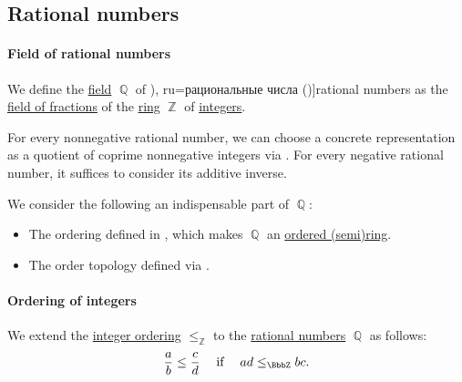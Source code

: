 \subsection{Rational numbers}\label{subsec:rational_numbers}

\paragraph{Field of rational numbers}

\begin{definition}\label{def:rational_numbers}
  We define the \hyperref[def:field]{field} \( \BbbQ \) of \term[bg=рационални числа (\cite[18]{Тагамлицки1971Диф}), ru=рациональные числа (\cite[sec. 15.1]{Тыртышников2007})]{rational numbers} as the \hyperref[thm:field_of_fractions]{field of fractions} of the \hyperref[def:ring]{ring} \( \BbbZ \) of \hyperref[def:integers]{integers}.
\end{definition}
\begin{comments}
  \item For every nonnegative rational number, we can choose a concrete representation as a quotient of coprime nonnegative integers via . For every negative rational number, it suffices to consider its additive inverse.

  \item We consider the following an indispensable part of \( \BbbQ \):
  \begin{itemize}
    \item The ordering defined in , which makes \( \BbbQ \) an \hyperref[def:ordered_semiring]{ordered (semi)ring}.
    \item The order topology defined via .
  \end{itemize}
\end{comments}

\paragraph{Ordering of integers}

\begin{definition}\label{def:rational_number_ordering}
  We extend the \hyperref[def:integer_ordering]{integer ordering} \( \leq_\BbbZ \) to the \hyperref[def:rational_numbers]{rational numbers} \( \BbbQ \) as follows:
  \begin{equation*}
    \frac a b \leq \frac c d \quad\T{if}\quad ad \leq_\BbbZ bc.
  \end{equation*}
\end{definition}

